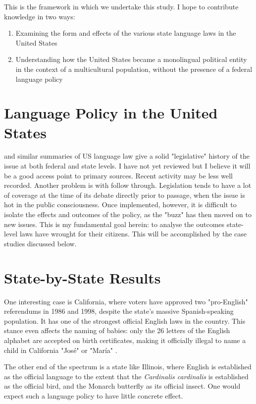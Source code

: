 \documentclass{article}
\begin{document}
This is the framework in which we undertake this study. I hope to
contribute knowledge in two ways:

\begin{enumerate}
\item Examining the form and effects of the various state language laws in the
United States
\item Understanding how the United States became a monolingual political entity
in the context of a multicultural population, without the presence of a federal
language policy
\end{enumerate}

\section*{Language Policy in the United States}

\cite{Baron92} and similar summaries of US language law give a solid
"legislative" history of the issue at both federal and state levels. I have not
yet reviewed \parencite{Crawford94} but I believe it will be a good access point
to primary sources. Recent activity may be less well recorded. Another problem
is with follow through.  Legislation tends to have a lot of coverage at the time
of its debate directly prior to passage, when the issue is hot in the public
consciousness. Once implemented, however, it is difficult to isolate the effects
and outcomes of the policy, as the "buzz" has then moved on to new issues. This
is my fundamental goal herein: to analyse the outcomes state-level laws have
wrought for their citizens. This will be accomplished by the case studies
discussed below.

\section*{State-by-State Results}

One interesting case is California, where voters have approved two "pro-English"
referendums in 1986 and 1998, despite the state's massive Spanish-speaking
population. It has one of the strongest official English laws in the country.
This stance even affects the naming of babies: only the 26 letters of the
English alphabet are accepted on birth certificates, making it officially
illegal to name a child in California "José" or "María" \textcite{Larson11}.

The other end of the spectrum is a state like Illinois, where English is
established as the official language to the extent that the \textit{Cardinalis
cardinalis} is established as the official bird, and the Monarch butterfly as
its official insect. One would expect such a language policy to have little
concrete effect.

\printbibliography
\end{document}
